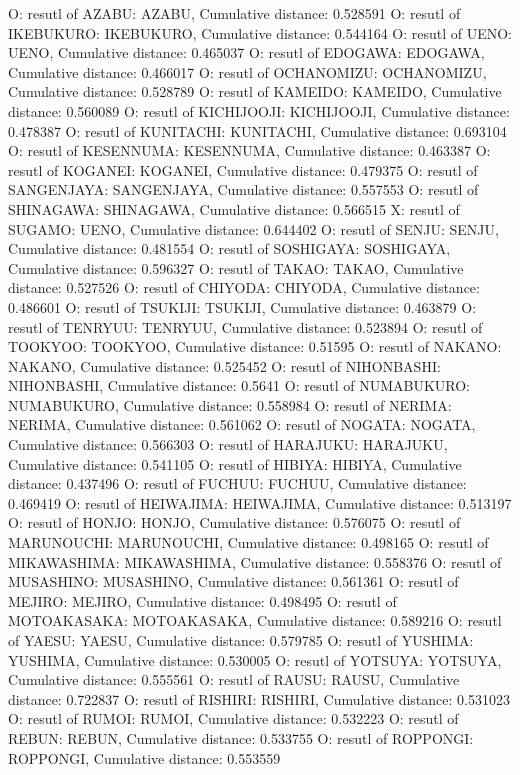 O: resutl of AZABU: AZABU, Cumulative distance: 0.528591
O: resutl of IKEBUKURO: IKEBUKURO, Cumulative distance: 0.544164
O: resutl of UENO: UENO, Cumulative distance: 0.465037
O: resutl of EDOGAWA: EDOGAWA, Cumulative distance: 0.466017
O: resutl of OCHANOMIZU: OCHANOMIZU, Cumulative distance: 0.528789
O: resutl of KAMEIDO: KAMEIDO, Cumulative distance: 0.560089
O: resutl of KICHIJOOJI: KICHIJOOJI, Cumulative distance: 0.478387
O: resutl of KUNITACHI: KUNITACHI, Cumulative distance: 0.693104
O: resutl of KESENNUMA: KESENNUMA, Cumulative distance: 0.463387
O: resutl of KOGANEI: KOGANEI, Cumulative distance: 0.479375
O: resutl of SANGENJAYA: SANGENJAYA, Cumulative distance: 0.557553
O: resutl of SHINAGAWA: SHINAGAWA, Cumulative distance: 0.566515
X: resutl of SUGAMO: UENO, Cumulative distance: 0.644402
O: resutl of SENJU: SENJU, Cumulative distance: 0.481554
O: resutl of SOSHIGAYA: SOSHIGAYA, Cumulative distance: 0.596327
O: resutl of TAKAO: TAKAO, Cumulative distance: 0.527526
O: resutl of CHIYODA: CHIYODA, Cumulative distance: 0.486601
O: resutl of TSUKIJI: TSUKIJI, Cumulative distance: 0.463879
O: resutl of TENRYUU: TENRYUU, Cumulative distance: 0.523894
O: resutl of TOOKYOO: TOOKYOO, Cumulative distance: 0.51595
O: resutl of NAKANO: NAKANO, Cumulative distance: 0.525452
O: resutl of NIHONBASHI: NIHONBASHI, Cumulative distance: 0.5641
O: resutl of NUMABUKURO: NUMABUKURO, Cumulative distance: 0.558984
O: resutl of NERIMA: NERIMA, Cumulative distance: 0.561062
O: resutl of NOGATA: NOGATA, Cumulative distance: 0.566303
O: resutl of HARAJUKU: HARAJUKU, Cumulative distance: 0.541105
O: resutl of HIBIYA: HIBIYA, Cumulative distance: 0.437496
O: resutl of FUCHUU: FUCHUU, Cumulative distance: 0.469419
O: resutl of HEIWAJIMA: HEIWAJIMA, Cumulative distance: 0.513197
O: resutl of HONJO: HONJO, Cumulative distance: 0.576075
O: resutl of MARUNOUCHI: MARUNOUCHI, Cumulative distance: 0.498165
O: resutl of MIKAWASHIMA: MIKAWASHIMA, Cumulative distance: 0.558376
O: resutl of MUSASHINO: MUSASHINO, Cumulative distance: 0.561361
O: resutl of MEJIRO: MEJIRO, Cumulative distance: 0.498495
O: resutl of MOTOAKASAKA: MOTOAKASAKA, Cumulative distance: 0.589216
O: resutl of YAESU: YAESU, Cumulative distance: 0.579785
O: resutl of YUSHIMA: YUSHIMA, Cumulative distance: 0.530005
O: resutl of YOTSUYA: YOTSUYA, Cumulative distance: 0.555561
O: resutl of RAUSU: RAUSU, Cumulative distance: 0.722837
O: resutl of RISHIRI: RISHIRI, Cumulative distance: 0.531023
O: resutl of RUMOI: RUMOI, Cumulative distance: 0.532223
O: resutl of REBUN: REBUN, Cumulative distance: 0.533755
O: resutl of ROPPONGI: ROPPONGI, Cumulative distance: 0.553559
